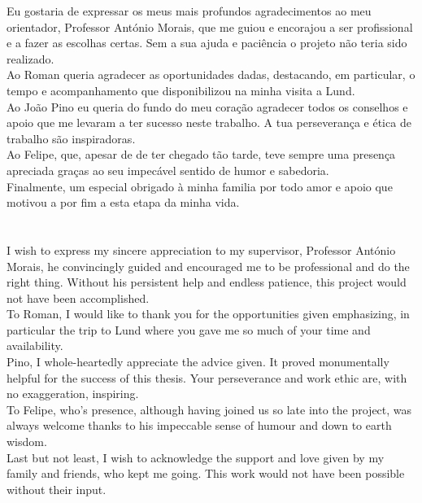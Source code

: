 \documentclass[10pt]{report}
\renewcommand{\(}{\left(}
\renewcommand{\)}{\right)}
\renewcommand{\[}{\left[}
\renewcommand{\]}{\right]}
\begin{document}
\TitlePage
  \vspace*{55mm}
       {Eu gostaria de expressar os meus mais profundos agradecimentos ao meu orientador, Professor António Morais, que me guiou e encorajou a ser profissional e a fazer as escolhas certas. Sem a sua ajuda e paciência o projeto não teria sido realizado.  
       \\
	   Ao Roman queria agradecer as oportunidades dadas, destacando, em particular, o tempo e acompanhamento que disponibilizou na minha visita a Lund.
       \\
       Ao João Pino eu queria do fundo do meu coração agradecer todos os conselhos e apoio que me levaram a ter sucesso neste trabalho. A tua perseverança e ética de trabalho são inspiradoras.
       \\ 
       Ao Felipe, que, apesar de de ter chegado tão tarde, teve sempre uma presença apreciada graças ao seu impecável sentido de humor e sabedoria. 
       \\ 
       Finalmente, um especial obrigado à minha familia por todo amor e apoio que motivou a por fim a esta etapa da minha vida. \\   
       \ \\ \ \\ }
  \TEXT{}
       {I wish to express my sincere appreciation to my supervisor, Professor António Morais, he convincingly guided and encouraged me to be professional and do the right thing.  Without his persistent help and endless patience, this project would not have been accomplished.
       \\ 
	   To Roman, I would like to thank you for the opportunities given emphasizing, in particular the trip to Lund where you gave me so much of your time and availability.
       \\
       Pino, I whole-heartedly appreciate the advice given. It proved monumentally helpful for the success of this thesis. Your perseverance and work ethic are, with no exaggeration, inspiring.
       \\
       To Felipe,  who's presence, although having joined us so late into the project, was always welcome thanks to his impeccable sense of humour and down to earth wisdom.
       \\
       Last but not least, I wish to acknowledge the support and love given by my family and friends, who kept me going. This work would not have been possible without their input.
        }
\EndTitlePage
\titlepage\ \endtitlepage %
\end{document}
